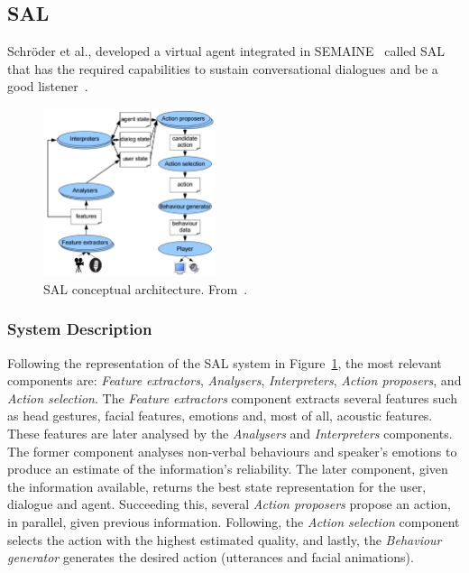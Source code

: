 \subsection{\acf{SAL}}
\label{subsec:AutonomousSensitiveArtificialListeners}

Schröder et al., developed a virtual agent integrated in SEMAINE~\cite{Schroder2010} called \acf{SAL} that has the required capabilities to sustain conversational dialogues and be a good listener~\cite{Schroder2012}.

\begin{figure}[H]
	\centering
	\includegraphics[width=0.45\textwidth]{images/SensitiveAgent.png}
	\caption{\acf{SAL} conceptual architecture. From~\cite{Schroder2012}.}
	\label{fig:sensitiveAgent}
\end{figure}


\subsubsection*{System Description}
Following the representation of the \ac{SAL} system in Figure~\ref{fig:sensitiveAgent}, the most relevant components are: \textit{Feature extractors}, \textit{Analysers}, \textit{Interpreters}, \textit{Action proposers}, and \textit{Action selection}. The \textit{Feature extractors} component extracts several features such as head gestures, facial features, emotions and, most of all, acoustic features. These features are later analysed by the \textit{Analysers} and \textit{Interpreters} components. The former component analyses non-verbal behaviours and speaker's emotions to produce an estimate of the information's reliability. The later component, given the information available, returns the best state representation for the user, dialogue and agent. Succeeding this, several \textit{Action proposers} propose an action, in parallel, given previous information. Following, the \textit{Action selection} component selects the action with the highest estimated quality, and lastly, the \textit{Behaviour generator} generates the desired action (utterances and facial animations).


